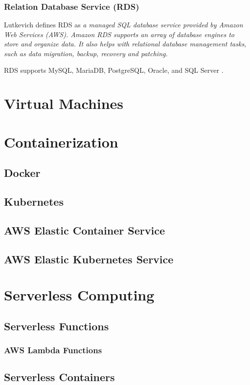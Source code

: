 \subsection{Relation Database Service (RDS)}
Lutkevich \cite{lutkevich_2021} defines RDS as \emph{a managed SQL database service provided by Amazon Web Services (AWS). Amazon RDS supports an array of database engines to store and organize data. 
It also helps with relational database management tasks, such as data migration, backup, recovery and patching.}

RDS supports MySQL, MariaDB, PostgreSQL, Oracle, and SQL Server \cite{beach2019relational}.

\chapter{Virtual Machines}

\chapter{Containerization}
\section{Docker}
\section{Kubernetes}
\section{AWS Elastic Container Service}
\section{AWS Elastic Kubernetes Service}

\chapter{Serverless Computing}
\section{Serverless Functions}
\subsection{AWS Lambda Functions}
\section{Serverless Containers}
